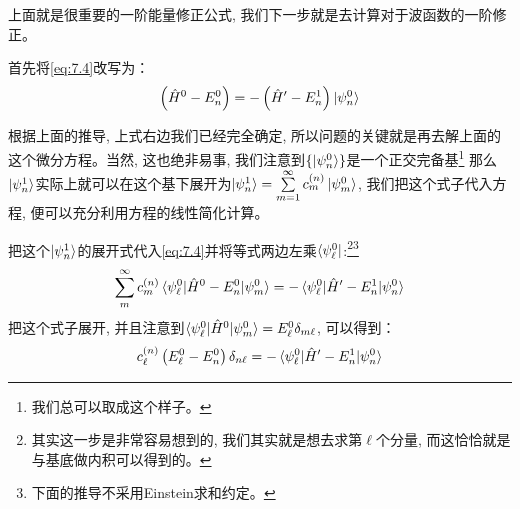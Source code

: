 \documentclass[a4paper,zihao=-4,linespread=1]{ctexrep}
\begin{document}
    上面就是很重要的一阶能量修正公式, 我们下一步就是去计算对于波函数的一阶修正。

    首先将\ref{eq:7.4}改写为：
    \begin{equation}
        \label{eq:7.6}
        \left(\hat{H}^0-E_n^0\right)=-\left(\hat{H}^\prime-E_n^1\right)\ket{\psi_n^0}
    \end{equation}
    
    根据上面的推导, 上式右边我们已经完全确定, 所以问题的关键就是再去解上面的这个微分方程。当然, 这也绝非易事, 我们注意到$\{\ket{\psi_n^0}\}$是一个正交完备基\footnote{我们总可以取成这个样子。}
    那么$\ket{\psi_n^1}$实际上就可以在这个基下展开为$\ket{\psi_n^1}=\sum\limits_{m=1}^\infty c_m^{(n)}\ket{\psi_m^0}$, 我们把这个式子代入方程, 便可以充分利用方程的线性简化计算。

    把这个$\ket{\psi_n^1}$的展开式代入\ref{eq:7.4}并将等式两边左乘$\bra{\psi_\ell^0}$:\footnote{其实这一步是非常容易想到的, 我们其实就是想去求第$\ell$个分量, 而这恰恰就是与基底做内积可以得到的。}\footnote{下面的推导不采用Einstein求和约定。}
    \begin{equation}
        \sum\limits_{m}^\infty c_m^{(n)}\braket{\psi_\ell^0|\hat{H}^0-E_n^0|\psi_m^0}=-\braket{\psi_\ell^0|\hat{H}^\prime-E_n^1|\psi_n^0}
    \end{equation}
    把这个式子展开, 并且注意到$\braket{\psi_\ell^0|\hat{H}^0|\psi_m^0}=E_\ell^0\delta_{m\ell}$, 可以得到：
    \begin{equation}
        c^{(n)}_\ell \left(E^0_\ell -E^0_n\right)\delta_{n\ell}=-\braket{\psi_\ell^0|\hat{H}^\prime-E_n^1|\psi_n^0}
    \end{equation}
    
\end{document}
